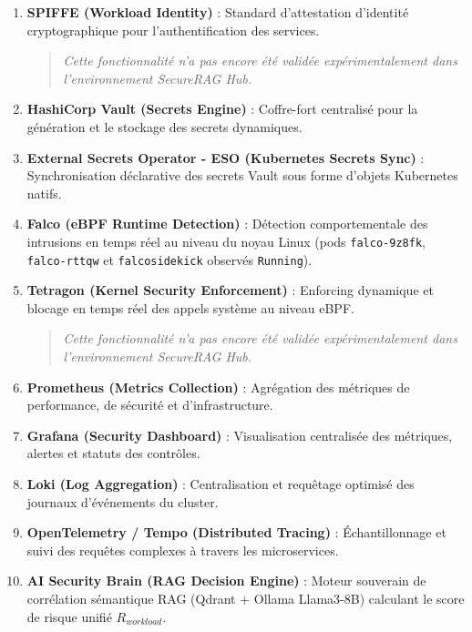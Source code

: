 \begin{enumerate}
    \begin{quote}
    \itshape Cette fonctionnalité n'a pas encore été validée expérimentalement dans l'environnement SecureRAG Hub.
    \end{quote}
    \item \textbf{SPIFFE (Workload Identity)} : Standard d'attestation d'identité cryptographique pour l'authentification des services.
    \begin{quote}
    \itshape Cette fonctionnalité n'a pas encore été validée expérimentalement dans l'environnement SecureRAG Hub.
    \end{quote}
    \item \textbf{HashiCorp Vault (Secrets Engine)} : Coffre-fort centralisé pour la génération et le stockage des secrets dynamiques.
    \item \textbf{External Secrets Operator - ESO (Kubernetes Secrets Sync)} : Synchronisation déclarative des secrets Vault sous forme d'objets Kubernetes natifs.
    \item \textbf{Falco (eBPF Runtime Detection)} : Détection comportementale des intrusions en temps réel au niveau du noyau Linux (pods \texttt{falco-9z8fk}, \texttt{falco-rttqw} et \texttt{falcosidekick} observés \texttt{Running}).
    \item \textbf{Tetragon (Kernel Security Enforcement)} : Enforcing dynamique et blocage en temps réel des appels système au niveau eBPF.
    \begin{quote}
    \itshape Cette fonctionnalité n'a pas encore été validée expérimentalement dans l'environnement SecureRAG Hub.
    \end{quote}
    \item \textbf{Prometheus (Metrics Collection)} : Agrégation des métriques de performance, de sécurité et d'infrastructure.
    \item \textbf{Grafana (Security Dashboard)} : Visualisation centralisée des métriques, alertes et statuts des contrôles.
    \item \textbf{Loki (Log Aggregation)} : Centralisation et requêtage optimisé des journaux d'événements du cluster.
    \item \textbf{OpenTelemetry / Tempo (Distributed Tracing)} : Échantillonnage et suivi des requêtes complexes à travers les microservices.
    \item \textbf{AI Security Brain (RAG Decision Engine)} : Moteur souverain de corrélation sémantique RAG (Qdrant + Ollama Llama3-8B) calculant le score de risque unifié $R_{workload}$.
\end{enumerate}

